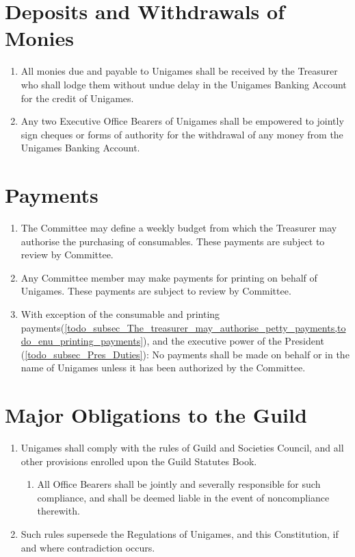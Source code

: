 \documentclass[a4paper]{article}
\begin{document}
\section{Deposits and Withdrawals of Monies} \label{sec:monies}
\begin{enumerate}
    \item All monies due and payable to Unigames shall be received by the Treasurer who shall lodge them without undue delay in the Unigames Banking Account for the credit of Unigames.
    \item Any two Executive Office Bearers of Unigames shall be empowered to jointly sign cheques or forms of authority for the withdrawal of any money from the Unigames Banking Account.
\end{enumerate}


\section{Payments} \label{sec:payments}
\begin{enumerate}
    \item \label{todo_subsec_The_treasurer_may_authorise_petty_payments}The Committee may define a weekly budget from which the Treasurer may authorise the purchasing of consumables. These payments are subject to review by Committee.
    \item \label{todo_enu_printing_payments} Any Committee member may make payments for printing on behalf of Unigames. These payments are subject to review by Committee.
    \item With exception of the consumable and printing payments(\cref{todo_subsec_The_treasurer_may_authorise_petty_payments,todo_enu_printing_payments}), and the executive power of the President (\cref{todo_subsec_Pres_Duties}): No payments shall be made on behalf or in the name of Unigames unless it has been authorized by the Committee.
\end{enumerate}


\section{Major Obligations to the Guild} \label{sec:obligations}
\begin{enumerate}
    \item Unigames shall comply with the rules of Guild and Societies Council, and all other provisions enrolled upon the Guild Statutes Book.
          \begin{enumerate}
              \item All Office Bearers shall be jointly and severally responsible for such compliance, and shall be deemed liable in the event of noncompliance therewith.
          \end{enumerate}
    \item Such rules supersede the Regulations of Unigames, and this Constitution, if and where contradiction occurs.
\end{enumerate}
\end{document}
